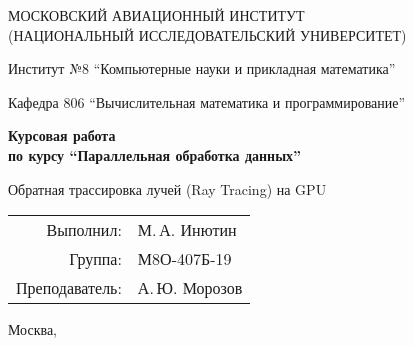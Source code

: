 \begin{titlepage}
\begin{center}
\large
МОСКОВСКИЙ АВИАЦИОННЫЙ ИНСТИТУТ\\ (НАЦИОНАЛЬНЫЙ ИССЛЕДОВАТЕЛЬСКИЙ УНИВЕРСИТЕТ)

\vspace{20pt}

Институт №8 \enquote{Компьютерные науки и прикладная математика}

Кафедра 806 \enquote{Вычислительная математика и программирование}
\end{center}

\vspace{60pt}

\begin{center}
\bfseries
\large
Курсовая работа\\
по курсу \enquote{Параллельная обработка данных}

\vspace{54pt}

Обратная трассировка лучей (Ray Tracing) на GPU
\end{center}

\vfill

\begin{flushright}
\large
\begin{tabular}{rl}
Выполнил: & М.\,А. Инютин \\
Группа: & М8О-407Б-19 \\
Преподаватель: & А.\,Ю. Морозов \\
\end{tabular}
\end{flushright}

\vspace{92pt}

\begin{center}
\large
Москва, \the\year
\end{center}
\end{titlepage}

\pagebreak
